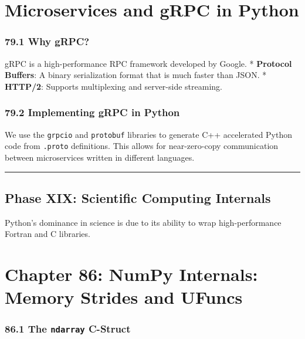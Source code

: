 \hypertarget{microservices-and-grpc-in-python}{%
\chapter{Microservices and gRPC in
Python}\label{microservices-and-grpc-in-python}}

\hypertarget{why-grpc}{%
\subsection{79.1 Why gRPC?}\label{why-grpc}}

gRPC is a high-performance RPC framework developed by Google. *
\textbf{Protocol Buffers}: A binary serialization format that is much
faster than JSON. * \textbf{HTTP/2}: Supports multiplexing and
server-side streaming.

\hypertarget{implementing-grpc-in-python}{%
\subsection{79.2 Implementing gRPC in
Python}\label{implementing-grpc-in-python}}

We use the \passthrough{\lstinline!grpcio!} and
\passthrough{\lstinline!protobuf!} libraries to generate C++ accelerated
Python code from \passthrough{\lstinline!.proto!} definitions. This
allows for near-zero-copy communication between microservices written in
different languages.

\begin{center}\rule{0.5\linewidth}{0.5pt}\end{center}

\hypertarget{phase-xix-scientific-computing-internals}{%
\section{Phase XIX: Scientific Computing
Internals}\label{phase-xix-scientific-computing-internals}}

Python's dominance in science is due to its ability to wrap
high-performance Fortran and C libraries.

\hypertarget{chapter-86-numpy-internals-memory-strides-and-ufuncs}{%
\chapter{Chapter 86: NumPy Internals: Memory Strides and
UFuncs}\label{chapter-86-numpy-internals-memory-strides-and-ufuncs}}

\hypertarget{the-ndarray-c-struct}{%
\subsection{\texorpdfstring{86.1 The \texttt{ndarray}
C-Struct}{86.1 The ndarray C-Struct}}\label{the-ndarray-c-struct}}

